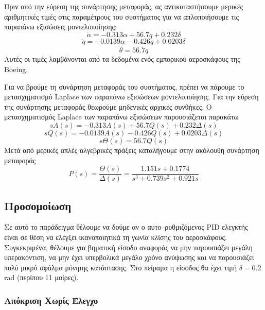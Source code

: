 Πριν από την εύρεση της συνάρτησης μεταφοράς, ας αντικαταστήσουμε μερικές αριθμητικές τιμές στις παραμέτρους του συστήματος για να απλοποιήσουμε τις παραπάνω εξισώσεις μοντελοποίησης:
\begin{equation}
\dot{\alpha} = -0.313\alpha + 56.7q + 0.232\delta
\end{equation}
\begin{equation}
\dot{q} = -0.0139\alpha - 0.426q + 0.0203\delta
\end{equation}
\begin{equation}
\dot{\theta} = 56.7q
\end{equation}
Αυτές οι τιμές λαμβάνονται από τα δεδομένα ενός εμπορικού αεροσκάφους της Boeing.

Για να βρούμε τη συνάρτηση μεταφοράς του συστήματος, πρέπει να πάρουμε το μετασχηματισμό Laplace των παραπάνω εξισώσεων μοντελοποίησης. Για την εύρεση της συνάρτησης μεταφοράς θεωρούμε μηδενικές αρχικές συνθήκες. Ο μετασχηματισμός Laplace των παραπάνω εξισώσεων παρουσιάζεται παρακάτω
\begin{equation}
sA(s)=-0.313A(s)+56.7Q(s)+0.232\Delta(s)
\end{equation}
\begin{equation}
sQ(s)=-0.0139A(s)-0.426Q(s)+0.0203\Delta(s)
\end{equation}
\begin{equation}
s\Theta(s) = 56.7Q(s)
\end{equation}
Μετά από μερικές απλές αλγεβρικές πράξεις καταλήγουμε στην ακόλουθη συνάρτηση μεταφοράς
\begin{equation}
P(s) = \frac{\Theta(s)}{\Delta(s)} = \frac{1.151s+0.1774}{s^3+0.739s^2+0.921s}
\label{eq:aircraft_tf}
\end{equation}

\subsection{Προσομοίωση}

Σε αυτό το παράδειγμα θέλουμε να δούμε αν ο αυτο--ρυθμιζόμενος PID ελεγκτής είναι σε θέση να ελέγξει ικανοποιητικά τη γωνία κλίσης του αεροσκάφους. Συγκεκριμένα, θέλουμε για βηματική είσοδο αναφοράς να μην παρουσιάζει μεγάλη υπερακόντιση, να μην έχει υπερβολικά μεγάλο χρόνο ανύψωσης και να παρουσιάζει πολύ μικρό σφάλμα μόνιμης κατάστασης. Στο πείραμα η είσοδος θα έχει τιμή $\delta=0.2$ rad (περίπου 11 μοίρες).

\subsubsection{Απόκριση Χωρίς Έλεγχο}

